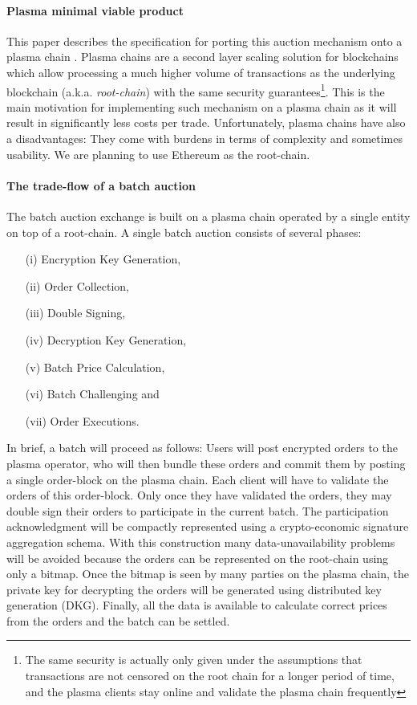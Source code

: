 \documentclass[11pt,parskip=full]{scrartcl}%
\begin{document}
\paragraph{Plasma minimal viable product}

This paper describes the specification for porting this auction mechanism onto a plasma chain \cite{plasma}. Plasma chains are a second layer scaling solution for blockchains which allow processing a much higher volume of transactions as the underlying blockchain (a.k.a. \emph{root-chain}) with the same security guarantees\footnote{The same security is actually only given under the assumptions that transactions are not censored on the root chain for a longer period of time, and the plasma clients stay online and validate the plasma chain frequently}. This is the main motivation for implementing such mechanism on a plasma chain as it will result in significantly less costs per trade. Unfortunately, plasma chains have also a disadvantages: They come with burdens in terms of complexity and sometimes usability. We are planning to use Ethereum as the root-chain. 

\paragraph{The trade-flow of a batch auction}  

The batch auction exchange is built on a plasma chain operated by a single entity on top of a root-chain. A single batch auction consists of several phases:
\begin{itemize}
\item[(i)] Encryption Key Generation, 
\item[(ii)] Order Collection, 
\item[(iii)] Double Signing, 
\item[(iv)] Decryption Key Generation,
\item[(v)] Batch Price Calculation,
\item[(vi)] Batch Challenging and 
\item[(vii)] Order Executions. 

\end{itemize}
In brief, a batch will proceed as follows: Users will post encrypted orders to the plasma operator, who will then bundle these orders and commit them by posting a single order-block on the plasma chain. Each client will have to validate the orders of this order-block. Only once they have validated the orders, they may double sign their orders to participate in the current batch. The participation acknowledgment will be compactly represented using a crypto-economic signature aggregation schema. With this construction many data-unavailability problems will be avoided because the orders can be represented on the root-chain using only a bitmap.
Once the bitmap is seen by many parties on the plasma chain, the private key for decrypting the orders will be generated using distributed key generation (DKG). Finally, all the data is available to calculate correct prices from the orders and the batch can be settled. 
\end{document}
